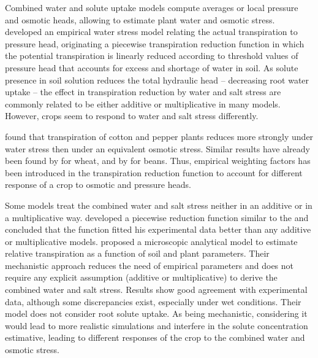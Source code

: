 Combined water and solute uptake models compute averages or local pressure and osmotic heads, allowing to estimate plant water and osmotic stress. 
\citeonline[feddes78] developed an empirical water stress model relating the actual transpiration to pressure head, originating a piecewise transpiration reduction function in which the potential transpiration is linearly reduced according to threshold values of pressure head that accounts for excess and shortage of water in soil.
As solute presence in soil solution reduces the total hydraulic head -- decreasing root water uptake -- the effect in transpiration reduction by water and salt stress are commonly related to be either additive 
or multiplicative 
in many models. 
However, crops seem to respond to water and salt stress differently. 

\citeonline[shalhevet] found that transpiration of cotton and pepper plants reduces more strongly under water stress then under an equivalent osmotic stress. 
Similar results have already been found by \citeonline[sepaskhah] for wheat, and by \citeonline[parra] for beans.
Thus, empirical weighting factors has been introduced in the transpiration reduction function to account for different response of a crop to osmotic and pressure heads.

Some models treat the combined water and salt stress neither in an additive or in a multiplicative way. \citeonline[homaee] developed a piecewise reduction function similar to the \citeonline[feddes78] and concluded that the function fitted his experimental data better than any additive or multiplicative models.
\citeonline[liersolute] proposed a microscopic analytical model to estimate relative transpiration as a function of soil and plant parameters. 
Their mechanistic approach reduces the need of empirical parameters and does not require any explicit assumption (additive or multiplicative) to derive the combined water and salt stress. 
Results show good agreement with experimental data, although some discrepancies exist, especially under wet conditions. 
Their model does not consider root solute uptake.
As being mechanistic, considering it would lead to more realistic simulations and interfere in the solute concentration estimative, leading to different responses of the crop to the combined water and osmotic stress.


